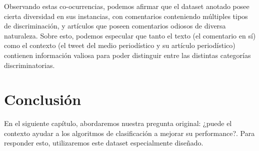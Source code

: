 Observando estas co-ocurrencias, podemos afirmar que el dataset anotado posee cierta diversidad en sus instancias, con comentarios conteniendo múltiples tipos de discriminación, y artículos que poseen comentarios odiosos de diversa naturaleza. Sobre esto, podemos especular que tanto el texto (el comentario en sí) como el contexto (el tweet del medio periodístico y su artículo periodístico) contienen información valiosa para poder distinguir entre las distintas categorías discriminatorias. 



\section{Conclusión}




En el siguiente capítulo, abordaremos nuestra pregunta original: ¿puede el contexto ayudar a los algoritmos de clasificación a mejorar su performance?. Para responder esto, utilizaremos este dataset especialmente diseñado.
